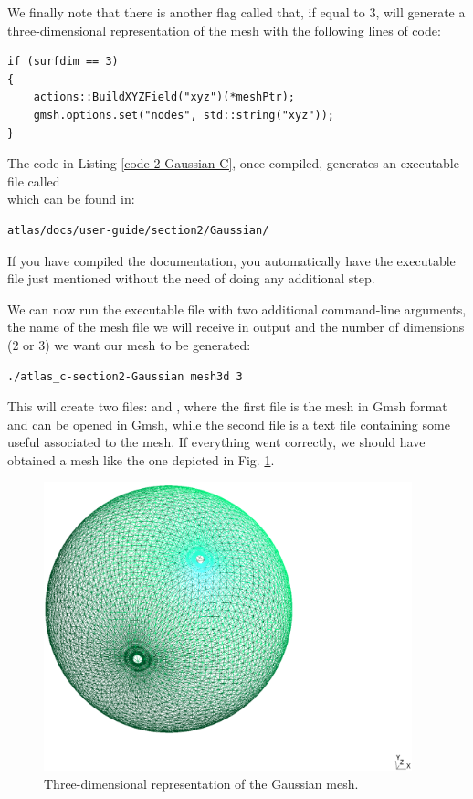 We finally note that there is another flag called  
that, if equal to 3, will generate a three-dimensional representation 
of the mesh with the following lines of code:
%
\begin{lstlisting}[style=CStyleNoLine]
if (surfdim == 3)
{
    actions::BuildXYZField("xyz")(*meshPtr);
    gmsh.options.set("nodes", std::string("xyz"));
}
\end{lstlisting}
%

The code in Listing \ref{code-2-Gaussian-C}, once compiled, generates 
an executable file called \\ 
 which can be found in:
%
\begin{lstlisting}[style=BashStyle]
atlas/docs/user-guide/section2/Gaussian/
\end{lstlisting}
% 
\begin{notebox}
If you have compiled the documentation, you automatically have 
the executable file just mentioned without the need of doing 
any additional step.
\end{notebox}
%
We can now run the executable file with two additional command-line 
arguments, the name of the mesh file we will receive in output and 
the number of dimensions (2 or 3) we want our mesh to be generated:
%
\begin{lstlisting}[style=BashStyle]
./atlas_c-section2-Gaussian mesh3d 3
\end{lstlisting}
% 
This will create two files:  and , 
where the first file is the mesh in Gmsh format and can be opened 
in Gmsh, while the second file is a text file containing some useful 
associated to the mesh.
If everything went correctly, we should have obtained a mesh like 
the one depicted in Fig. \ref{fig:section2-Gaussian-3d}.
%
\begin{figure}[H]
  \centering
    \includegraphics[width=0.95\textwidth]{imgs/Gaussian_3d}
    \caption{Three-dimensional representation of the Gaussian mesh.}
    \label{fig:section2-Gaussian-3d}
\end{figure}
